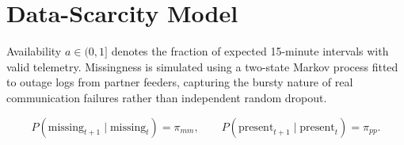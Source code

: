 \section{Data-Scarcity Model}
Availability $a \in (0,1]$ denotes the fraction of expected 15-minute intervals with valid
telemetry. Missingness is simulated using a two-state Markov process fitted to outage logs
from partner feeders, capturing the bursty nature of real communication failures rather than
independent random dropout.

\begin{equation}
\label{eq:markov}
P(\text{missing}_{t+1} \mid \text{missing}_t) = \pi_{mm}, \qquad
P(\text{present}_{t+1} \mid \text{present}_t) = \pi_{pp}.
\end{equation}
